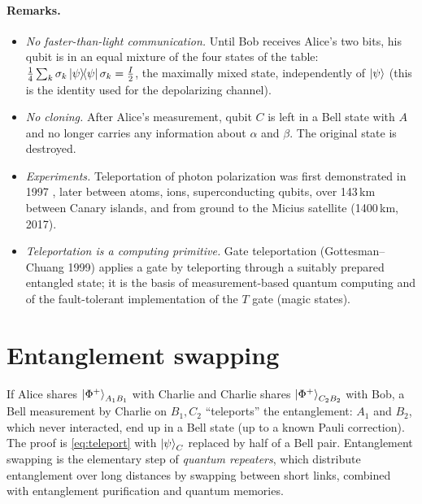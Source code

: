 \paragraph{Remarks.}
\begin{itemize}
  \item \emph{No faster-than-light communication.} Until Bob receives Alice's two bits, his qubit is in an equal mixture of the four states of the table:
  $\frac14\sum_k\sigma_k\left|\psi\middle\rangle\!\middle\langle\psi\right|\sigma_k=\frac I2$, the maximally mixed state, independently of $\left|\psi\right\rangle$ (this is the identity used for the depolarizing channel).
  \item \emph{No cloning.} After Alice's measurement, qubit $C$ is left in a Bell state with $A$ and no longer carries any information about $\alpha$ and $\beta$. The original state is destroyed.
  \item \emph{Experiments.} Teleportation of photon polarization was first demonstrated in 1997 \cite{Bouwmeester1997}, later between atoms, ions, superconducting qubits, over 143\,km
  between Canary islands, and from ground to the Micius satellite (1400\,km, 2017).
  \item \emph{Teleportation is a computing primitive.} Gate teleportation (Gottesman--Chuang 1999) applies a gate by teleporting through a suitably prepared entangled state; it is the
  basis of measurement-based quantum computing and of the fault-tolerant implementation of the $T$ gate (magic states).
\end{itemize}

\section{Entanglement swapping}
If Alice shares $\left|\Phi^+\right\rangle_{A_1B_1}$ with Charlie and Charlie shares $\left|\Phi^+\right\rangle_{C_2B_2}$ with Bob, a Bell measurement by Charlie on $B_1,C_2$ ``teleports'' the entanglement:
$A_1$ and $B_2$, which never interacted, end up in a Bell state (up to a known Pauli correction). The proof is \cref{eq:teleport} with $\left|\psi\right\rangle_C$ replaced by half of a Bell pair.
Entanglement swapping is the elementary step of \emph{quantum repeaters}, which distribute entanglement over long distances by swapping between short links, combined with
entanglement purification and quantum memories.


